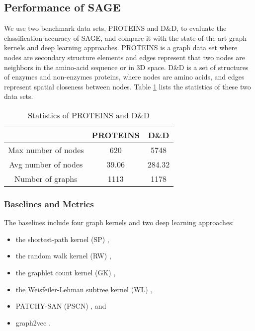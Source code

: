 \documentclass[sigconf]{acmart}
\begin{document}
\subsection{Performance of SAGE}
We use two benchmark data sets, PROTEINS and D\&D, to evaluate the classification accuracy of SAGE, and compare it with the state-of-the-art graph kernels and deep learning approaches.  PROTEINS \cite{borgwardt2005protein} is a graph data set where nodes are secondary structure elements and edges represent that two nodes are neighbors in the amino-acid sequence or in 3D space.  D\&D \cite{dobson2003distinguishing} is a set of structures of enzymes and non-enzymes proteins, where nodes are amino acids, and edges represent spatial closeness between nodes.  Table \ref{tab:twodatasets} lists the statistics of these two data sets.

\begin{table}
  \caption{Statistics of PROTEINS and D\&D}
  \label{tab:twodatasets}
  \begin{tabular}{ccc}
    \toprule
&\textbf{PROTEINS}& \textbf{D\&D}\\
    \midrule
	Max number of nodes &620&5748\\
	Avg number of nodes &39.06&284.32\\
	Number of graphs &1113&1178\\
  \bottomrule
\end{tabular}
\end{table}


\subsubsection{Baselines and Metrics}\label{bench.base}

The baselines include four graph kernels and two deep learning approaches:

\begin{itemize}
\item the shortest-path kernel (SP) \cite{borgwardt2005shortest},

\item the random walk kernel (RW) \cite{gartner2003graph},

\item the graphlet count kernel (GK) \cite{shervashidze2009efficient},

\item the Weisfeiler-Lehman subtree kernel (WL) \cite{shervashidze2011weisfeiler},

\item PATCHY-SAN (PSCN) \cite{Niepert2016LearningCN}, and

\item graph2vec \cite{DBLP:journals/corr/NarayananCVCLJ17}.

\end{itemize}
\end{document}
